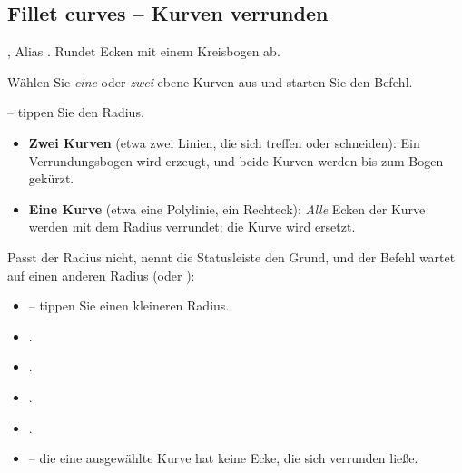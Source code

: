 \subsection{Fillet curves -- Kurven verrunden}\label{sec:cmd-fillet-curve}
, Alias . Rundet Ecken mit einem Kreisbogen ab.
\begin{schritte}
\item Wählen Sie \emph{eine} oder \emph{zwei} ebene Kurven aus und starten Sie den Befehl.
\item {} --
  tippen Sie den Radius.
\end{schritte}
\begin{itemize}
\item \textbf{Zwei Kurven} (etwa zwei Linien, die sich treffen oder schneiden): Ein
  Verrundungsbogen wird erzeugt, und beide Kurven werden bis zum Bogen gekürzt.
\item \textbf{Eine Kurve} (etwa eine Polylinie, ein Rechteck): \emph{Alle} Ecken der Kurve
  werden mit dem Radius verrundet; die Kurve wird ersetzt.
\end{itemize}
Passt der Radius nicht, nennt die Statusleiste den Grund, und der Befehl wartet auf einen
anderen Radius (oder ):
\begin{itemize}
\item {} -- tippen Sie einen kleineren Radius.
\item {}.
\item {}.
\item {}.
\item {}.
\item {} -- die eine ausgewählte Kurve hat keine Ecke, die
  sich verrunden ließe.
\end{itemize}

